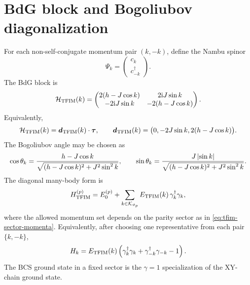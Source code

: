 \section{BdG block and Bogoliubov diagonalization}
\label{sec:tfim-bdg-block}

For each non-self-conjugate momentum pair $(k,-k)$, define the Nambu spinor
\begin{equation}
    \Psi_k=
    \begin{pmatrix}
        c_k\\ c_{-k}^\dagger
    \end{pmatrix}.
\end{equation}
The BdG block is
\begin{equation}
\label{eq:tfim-bdg-block}
    \mathcal{H}_{\rm TFIM}(k)
    =
    \begin{pmatrix}
        2(h-J\cos k)&2\mathrm{i} J\sin k\\
        -2\mathrm{i} J\sin k&-2(h-J\cos k)
    \end{pmatrix}.
\end{equation}
Equivalently,
\begin{equation}
\label{eq:tfim-bdg-vector}
    \mathcal{H}_{\rm TFIM}(k)
    =
    \bm d_{\rm TFIM}(k)\cdot\bm\tau,
    \qquad
    \bm d_{\rm TFIM}(k)=
    \bigl(0,-2J\sin k,2(h-J\cos k)\bigr).
\end{equation}
The Bogoliubov angle may be chosen as
\begin{equation}
\label{eq:tfim-bogoliubov-angle}
    \cos\theta_k=\frac{h-J\cos k}{
    \sqrt{(h-J\cos k)^2+J^2\sin^2 k}},
    \qquad
    \sin\theta_k=\frac{J\left|\sin k\right|}{
    \sqrt{(h-J\cos k)^2+J^2\sin^2 k}}.
\end{equation}
The diagonal many-body form is
\begin{equation}
\label{eq:tfim-diagonal-form}
    H_{\rm TFIM}^{(p)}
    =
    E_0^{(p)}+
    \sum_{k\in\mathcal{K}_{\vartheta_p}}
    E_{\rm TFIM}(k)\,\gamma_k^\dagger\gamma_k,
\end{equation}
where the allowed momentum set depends on the parity sector as in
\cref{eq:tfim-sector-momenta}.  Equivalently, after choosing one representative
from each pair $\{k,-k\}$,
\begin{equation}
\label{eq:tfim-pair-diagonal-form}
    H_k
    =
    E_{\rm TFIM}(k)
    \left(
        \gamma_k^\dagger\gamma_k
        +
        \gamma_{-k}^\dagger\gamma_{-k}
        -1
    \right).
\end{equation}
The BCS ground state in a fixed sector is the $\gamma=1$ specialization of the
XY-chain ground state.

